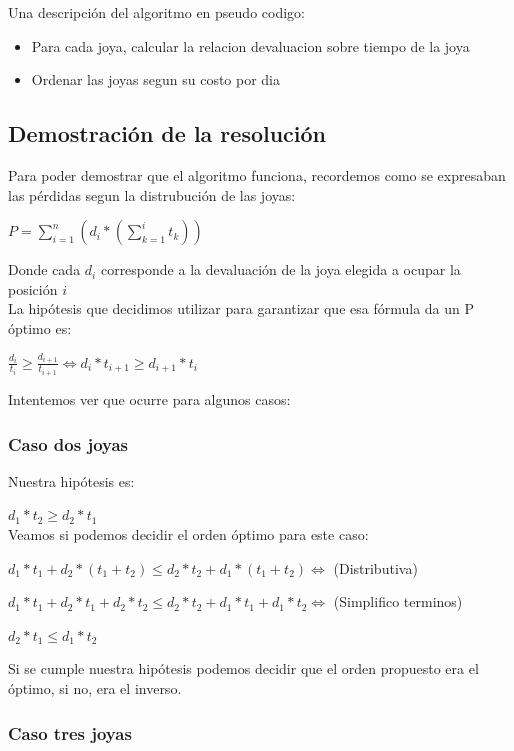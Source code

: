 Una descripci\'on del algoritmo en pseudo codigo:

\begin{itemize}
\item Para cada joya, calcular la relacion devaluacion sobre tiempo de la joya
\item Ordenar las joyas segun su costo por dia
\end{itemize}

\subsection{Demostraci\'on de la resoluci\'on}

Para poder demostrar que el algoritmo funciona, recordemos como se expresaban las p\'erdidas segun la distrubuci\'on de las joyas:

$P = \sum\limits_{i=1}^n (d_{i}*( \sum\limits_{k=1}^i t_k ))$

Donde cada $d_i$ corresponde a la devaluaci\'on de la joya elegida a ocupar la posici\'on $i$ \\

La hip\'otesis que decidimos utilizar para garantizar que esa f\'ormula da un P \'optimo es:

$ \frac{d_{i}}{t_{i}} \geq \frac{d_{i+1}}{t_{i+1}} \Longleftrightarrow d_i*t_{i+1} \geq d_{i+1}*t_i $

Intentemos ver que ocurre para algunos casos:

\subsubsection*{Caso dos joyas}

Nuestra hip\'otesis es:

$d_1*t_2 \geq d_2*t_1$ \\

Veamos si podemos decidir el orden \'optimo para este caso:

$d_1*t_1 + d_2*(t_1 + t_2) \leq d_2*t_2 + d_1*(t_1 + t_2) \Longleftrightarrow $ (Distributiva)

$d_1*t_1 + d_2*t_1 + d_2*t_2 \leq  d_2*t_2 + d_1*t_1 + d_1*t_2 \Longleftrightarrow$ (Simplifico terminos)

$d_2*t_1 \leq d_1*t_2$

Si se cumple nuestra hip\'otesis podemos decidir que el orden propuesto era el \'optimo, si no, era el inverso. \\

\subsubsection*{Caso tres joyas}

